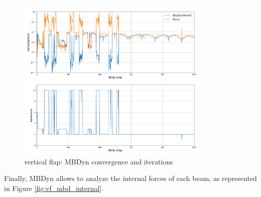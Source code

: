 \begin{figure}[htbp!]
	\centering
	\includegraphics[width=0.82\textwidth]{images/vert_flap/MBD_iterations_rho1.png}
	\caption{vertical flap: MBDyn convergence and iterations}
	\label{fig:vf_mbd_iter}
\end{figure}


Finally, MBDyn allows to analyze the internal forces of each beam, as represented in Figure \ref{fig:vf_mbd_internal}.

